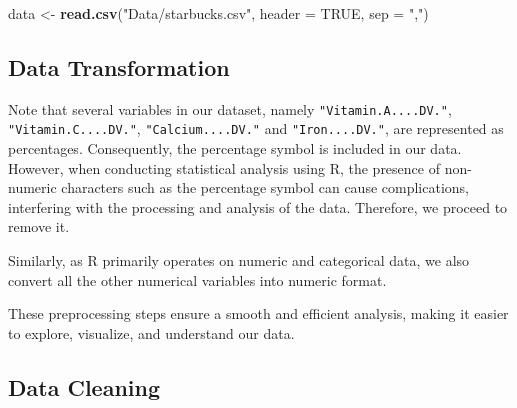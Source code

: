 \documentclass[
]{article}
\newenvironment{Shaded}{\begin{snugshade}}{\end{snugshade}}
\newcommand{\AttributeTok}[1]{\textcolor[rgb]{0.13,0.29,0.53}{#1}}
\newcommand{\CommentTok}[1]{\textcolor[rgb]{0.56,0.35,0.01}{\textit{#1}}}
\newcommand{\ConstantTok}[1]{\textcolor[rgb]{0.56,0.35,0.01}{#1}}
\newcommand{\FunctionTok}[1]{\textcolor[rgb]{0.13,0.29,0.53}{\textbf{#1}}}
\newcommand{\NormalTok}[1]{#1}
\newcommand{\OtherTok}[1]{\textcolor[rgb]{0.56,0.35,0.01}{#1}}
\newcommand{\SpecialCharTok}[1]{\textcolor[rgb]{0.81,0.36,0.00}{\textbf{#1}}}
\newcommand{\StringTok}[1]{\textcolor[rgb]{0.31,0.60,0.02}{#1}}
\begin{document}
\begin{Shaded}
\begin{Highlighting}[]
\NormalTok{data }\OtherTok{\textless{}{-}} \FunctionTok{read.csv}\NormalTok{(}\StringTok{"Data/starbucks.csv"}\NormalTok{, }\AttributeTok{header =} \ConstantTok{TRUE}\NormalTok{, }\AttributeTok{sep =} \StringTok{","}\NormalTok{)}
\end{Highlighting}
\end{Shaded}

\subsection{Data Transformation}\label{data-transformation}

Note that several variables in our dataset, namely
\texttt{"Vitamin.A....DV."}, \texttt{"Vitamin.C....DV."},
\texttt{"Calcium....DV."} and \texttt{"Iron....DV."}, are represented as
percentages. Consequently, the percentage symbol is included in our
data. However, when conducting statistical analysis using R, the
presence of non-numeric characters such as the percentage symbol can
cause complications, interfering with the processing and analysis of the
data. Therefore, we proceed to remove it.

Similarly, as R primarily operates on numeric and categorical data, we
also convert all the other numerical variables into numeric format.

These preprocessing steps ensure a smooth and efficient analysis, making
it easier to explore, visualize, and understand our data.

\begin{Shaded}
\end{Shaded}

\subsection{Data Cleaning}\label{data-cleaning}
\end{document}
